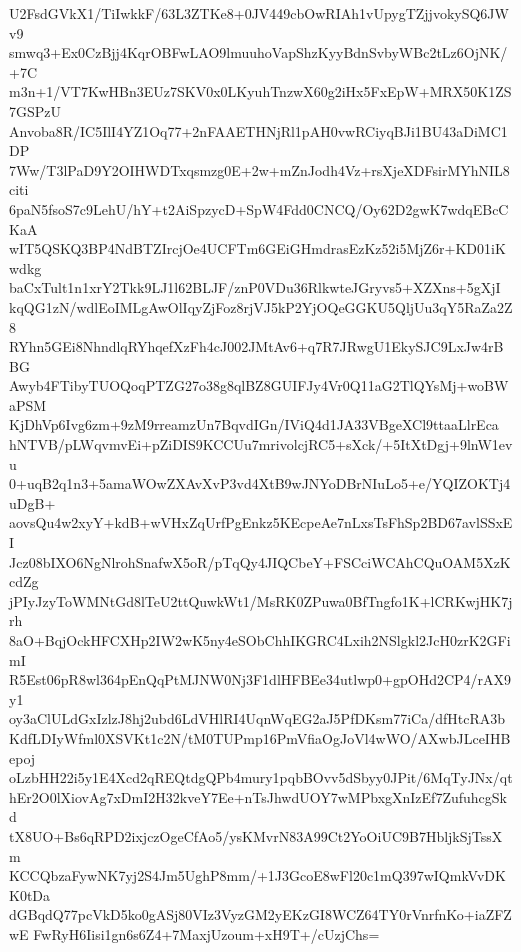 U2FsdGVkX1/TiIwkkF/63L3ZTKe8+0JV449cbOwRIAh1vUpygTZjjvokySQ6JWv9
smwq3+Ex0CzBjj4KqrOBFwLAO9lmuuhoVapShzKyyBdnSvbyWBc2tLz6OjNK/+7C
m3n+1/VT7KwHBn3EUz7SKV0x0LKyuhTnzwX60g2iHx5FxEpW+MRX50K1ZS7GSPzU
Anvoba8R/IC5IlI4YZ1Oq77+2nFAAETHNjRl1pAH0vwRCiyqBJi1BU43aDiMC1DP
7Ww/T3lPaD9Y2OIHWDTxqsmzg0E+2w+mZnJodh4Vz+rsXjeXDFsirMYhNIL8citi
6paN5fsoS7c9LehU/hY+t2AiSpzycD+SpW4Fdd0CNCQ/Oy62D2gwK7wdqEBcCKaA
wIT5QSKQ3BP4NdBTZIrcjOe4UCFTm6GEiGHmdrasEzKz52i5MjZ6r+KD01iKwdkg
baCxTult1n1xrY2Tkk9LJ1l62BLJF/znP0VDu36RlkwteJGryvs5+XZXns+5gXjI
kqQG1zN/wdlEoIMLgAwOlIqyZjFoz8rjVJ5kP2YjOQeGGKU5QljUu3qY5RaZa2Z8
RYhn5GEi8NhndlqRYhqefXzFh4cJ002JMtAv6+q7R7JRwgU1EkySJC9LxJw4rBBG
Awyb4FTibyTUOQoqPTZG27o38g8qlBZ8GUIFJy4Vr0Q11aG2TlQYsMj+woBWaPSM
KjDhVp6Ivg6zm+9zM9rreamzUn7BqvdIGn/IViQ4d1JA33VBgeXCl9ttaaLlrEca
hNTVB/pLWqvmvEi+pZiDIS9KCCUu7mrivolcjRC5+sXck/+5ItXtDgj+9lnW1evu
0+uqB2q1n3+5amaWOwZXAvXvP3vd4XtB9wJNYoDBrNIuLo5+e/YQIZOKTj4uDgB+
aovsQu4w2xyY+kdB+wVHxZqUrfPgEnkz5KEcpeAe7nLxsTsFhSp2BD67avlSSxEI
Jcz08bIXO6NgNlrohSnafwX5oR/pTqQy4JIQCbeY+FSCciWCAhCQuOAM5XzKcdZg
jPIyJzyToWMNtGd8lTeU2ttQuwkWt1/MsRK0ZPuwa0BfTngfo1K+lCRKwjHK7jrh
8aO+BqjOckHFCXHp2IW2wK5ny4eSObChhIKGRC4Lxih2NSlgkl2JcH0zrK2GFimI
R5Est06pR8wl364pEnQqPtMJNW0Nj3F1dlHFBEe34utlwp0+gpOHd2CP4/rAX9y1
oy3aClULdGxIzlzJ8hj2ubd6LdVHlRI4UqnWqEG2aJ5PfDKsm77iCa/dfHtcRA3b
KdfLDIyWfml0XSVKt1c2N/tM0TUPmp16PmVfiaOgJoVl4wWO/AXwbJLceIHBepoj
oLzbHH22i5y1E4Xcd2qREQtdgQPb4mury1pqbBOvv5dSbyy0JPit/6MqTyJNx/qt
hEr2O0lXiovAg7xDmI2H32kveY7Ee+nTsJhwdUOY7wMPbxgXnIzEf7ZufuhcgSkd
tX8UO+Bs6qRPD2ixjczOgeCfAo5/ysKMvrN83A99Ct2YoOiUC9B7HbljkSjTssXm
KCCQbzaFywNK7yj2S4Jm5UghP8mm/+1J3GcoE8wFl20c1mQ397wIQmkVvDKK0tDa
dGBqdQ77pcVkD5ko0gASj80VIz3VyzGM2yEKzGI8WCZ64TY0rVnrfnKo+iaZFZwE
FwRyH6Iisi1gn6s6Z4+7MaxjUzoum+xH9T+/cUzjChs=
